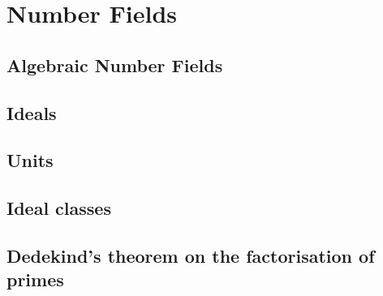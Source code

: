 \documentclass[main.tex]{subfiles}
\begin{document}
	\chapter{Number Fields}
		\section{Algebraic Number Fields}
		
		\section{Ideals}
		
		\section{Units}
		
		\section{Ideal classes}
		
		\section{Dedekind’s theorem on the factorisation of primes}		
\end{document}
